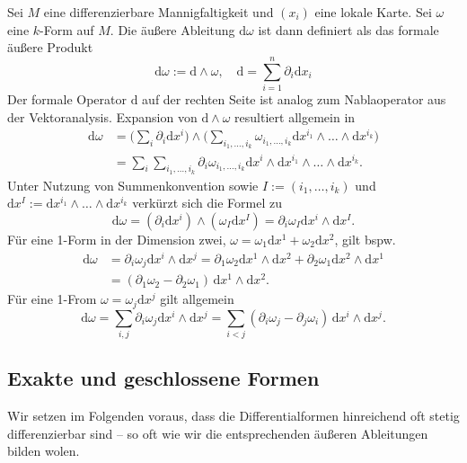 Sei $M$ eine differenzierbare Mannigfaltigkeit und $(x_i)$ eine
lokale Karte. Sei $\omega$ eine $k$-Form auf $M$. Die äußere Ableitung
$\mathrm d\omega$ ist dann definiert als das formale äußere Produkt%
\begin{equation}
\mathrm d\omega := \mathrm d\wedge\omega,\quad
\mathrm d = \sum_{i=1}^n \partial_i\mathrm dx_i
\end{equation}
Der formale Operator $\mathrm d$ auf der rechten Seite ist analog
zum Nablaoperator aus der Vektoranalysis.
Expansion von $\mathrm d\wedge\omega$ resultiert allgemein in%
\begin{align}
\mathrm d\omega &= \Big(\sum_i \partial_i\mathrm dx^i\Big)\wedge \Big(\sum_{i_1,\ldots,i_k}
\omega_{i_1,\ldots,i_k}\mathrm dx^{i_1}\wedge\ldots\wedge\mathrm dx^{i_k}\Big)\\
&= \sum_i\sum_{i_1,\ldots,i_k} \partial_i\omega_{i_1,\ldots,i_k}
\mathrm dx^i\wedge\mathrm dx^{i_1}\wedge\ldots\wedge\mathrm dx^{i_k}.
\end{align}
Unter Nutzung von Summenkonvention sowie $I:=(i_1,\ldots,i_k)$ und
$\mathrm dx^I := \mathrm dx^{i_1}\wedge\ldots\wedge\mathrm dx^{i_k}$
verkürzt sich die Formel zu%
\begin{equation}
\mathrm d\omega = (\partial_i \mathrm dx^i)\wedge (\omega_I\mathrm dx^I)
= \partial_i\omega_I\mathrm dx^i\wedge\mathrm dx^I.
\end{equation}
Für eine 1-Form in der Dimension zwei,
$\omega = \omega_1\mathrm dx^1+\omega_2\mathrm dx^2$, gilt bspw.
\begin{align}
\mathrm d\omega &= \partial_i\omega_j\mathrm dx^i\wedge\mathrm dx^j
= \partial_1\omega_2\mathrm dx^1\wedge\mathrm dx^2
+ \partial_2\omega_1\mathrm dx^2\wedge\mathrm dx^1\\
&= (\partial_1\omega_2-\partial_2\omega_1)\,\mathrm dx^1\wedge\mathrm dx^2.
\end{align}
Für eine 1-From $\omega=\omega_j\mathrm dx^j$ gilt allgemein
\begin{equation}
\mathrm d\omega = \sum_{i,j}\partial_i\omega_j\mathrm dx^i\wedge\mathrm dx^j
= \sum_{i<j}(\partial_i\omega_j-\partial_j\omega_i)\,\mathrm dx^i\wedge\mathrm dx^j.
\end{equation}

\subsection{Exakte und geschlossene Formen}

Wir setzen im Folgenden voraus, dass die Differentialformen hinreichend
oft stetig differenzierbar sind -- so oft wie wir die entsprechenden
äußeren Ableitungen bilden wolen.

